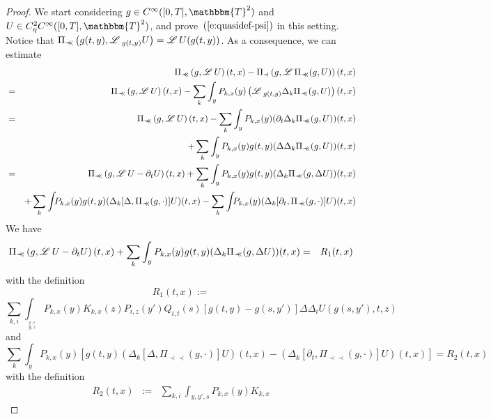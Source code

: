 \documentclass[11pt,reqno]{amsart}
\newcommand{\assign}{:=}
\newcommand{\precprec}{\prec\!\!\!\prec}
\newcommand{\LL}{\mathscr{L} \hspace{.2em}}
\begin{document}
\begin{proof}
  We start considering $g \in C^{\infty} ([0, T], \mathbbm{T}^2)$ and $U \in
  C_{\eta}^2 C^{\infty} ([0, T], \mathbbm{T}^2)$, and
  prove~$(\ref{e:quasidef-psi})$ in this setting. Notice that $\Pi_{\precprec}
  \left( g (t, y), \LL_{g (t, y)} U \right) = \LL U (g (t, y))$. As a
  consequence, we can estimate
  \begin{eqnarray*}
    &  & \Pi_{\precprec} \left( g, \LL U \right) (t, x) - \Pi_{\prec} \left(
    g, \LL \Pi_{\precprec} (g, U) \right) (t, x)\\
    & = & \Pi_{\precprec} \left( g, \LL U \right) (t, x) - \sum_k \int_y
    P_{k, x} (y) \left( \LL_{g (t, y)} \Delta_k \Pi_{\precprec} (g, U) \right)
    (t, x)\\
    & = & \Pi_{\precprec} \left( g, \LL U \right) (t, x) - \sum_k \int_y
    P_{k, x} (y) (\partial_t \Delta_k \Pi_{\precprec} (g, U)) (t, x)\\
    &  & + \sum_k \int_y P_{k, x} (y) g (t, y) (\Delta \Delta_k
    \Pi_{\precprec} (g, U)) (t, x)\\
    & = & \Pi_{\precprec} \left( g, \LL U - \partial_t U \right) (t, x) +
    \sum_k \int_y P_{k, x} (y) g (t, y) (\Delta_k \Pi_{\precprec} (g, \Delta
    U)) (t, x)\\
    &  & + \sum_k \int_{} P_{k, x} (y) g (t, y) (\Delta_k [\Delta,
    \Pi_{\precprec} (g, \cdot)] U) (t, x) - \sum_k \int_{} P_{k, x} (y)
    (\Delta_k [\partial_t, \Pi_{\precprec} (g, \cdot)] U) (t, x)
  \end{eqnarray*}
  We have
  \begin{eqnarray*}
    \Pi_{\precprec} \left( g, \LL U - \partial_t U \right) (t, x) + \sum_k
    \int_y P_{k, x} (y) g (t, y) (\Delta_k \Pi_{\precprec} (g, \Delta U)) (t,
    x) & = & R_1 (t, x)
  \end{eqnarray*}
  with the definition
  \[ R_1 (t, x) \assign \]
  \begin{equation}
    \sum_{k, i} \int_{_{\overset{y', s}{y, z}}} P_{k, x} (y) K_{k, x} (z)
    P_{i, z} (y') Q_{i, t} (s) [g (t, y) - g (s, y')] \Delta \Delta_i U (g (s,
    y'), t, z) \label{e:rem-1}
  \end{equation}
  and
  \[ \sum_k \int_y P_{k, x} (y) [g (t, y) (\Delta_k [\Delta, \Pi_{\precprec}
     (g, \cdot)] U) (t, x) - (\Delta_k [\partial_t, \Pi_{\precprec} (g,
     \cdot)] U) (t, x)] = R_2 (t, x) \]
  with the definition
  \begin{eqnarray}
    R_2 (t, x) & \assign & \sum_{k, i} \int_{y, y', s} P_{k, x} (y) K_{k, x}

\end{eqnarray}
\end{proof}
\end{document}
